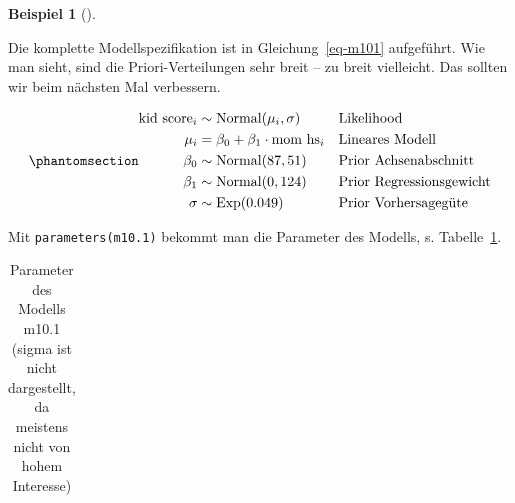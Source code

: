\documentclass[
  ngerman,
  letterpaper,
  twoside,
  open=any]{scrbook}
\theoremstyle{definition}
\newtheorem{example}{Beispiel}[chapter]
\theoremstyle{plain}
\theoremstyle{definition}
\theoremstyle{definition}
\theoremstyle{remark}
\begin{document}
\begin{example}[]
\begin{codelisting}
{}

\end{codelisting}%

Die komplette Modellspezifikation ist in Gleichung~\ref{eq-m101}
aufgeführt. Wie man sieht, sind die Priori-Verteilungen sehr breit -- zu
breit vielleicht. Das sollten wir beim nächsten Mal verbessern.

\begin{equation}\protect\phantomsection\label{eq-m101}{\begin{aligned}
\text{kid score}_i &\sim \operatorname{Normal}(\mu_i, \sigma) && \text{Likelihood} \\
\mu_i &= \beta_0 + \beta_1 \cdot \text{mom hs}_i && \text{Lineares Modell} \\
\beta_0 &\sim \operatorname{Normal}(87, 51) && \text{Prior Achsenabschnitt} \\
\beta_1 &\sim \operatorname{Normal}(0, 124) && \text{Prior Regressionsgewicht} \\
\sigma &\sim \operatorname{Exp}(0.049) && \text{Prior Vorhersagegüte}
\end{aligned}
}\end{equation}

Mit \texttt{parameters(m10.1)} bekommt man die Parameter des Modells, s.
Tabelle~\ref{tbl-m101}.

{

\begin{longtable}[]{@{}
  >{\raggedright\arraybackslash}p{}
  >{\centering\arraybackslash}p{}
  >{\centering\arraybackslash}p{}
  >{\centering\arraybackslash}p{}
  >{\centering\arraybackslash}p{}
  >{\centering\arraybackslash}p{}
  >{\centering\arraybackslash}p{}@{}}

\caption{\label{tbl-m101}Parameter des Modells m10.1 (sigma ist nicht
dargestellt, da meistens nicht von hohem Interesse)}

\tabularnewline


\end{longtable}}
\end{example}
\end{document}
